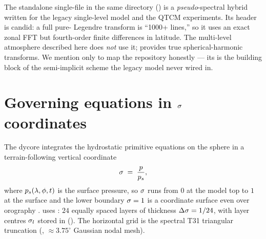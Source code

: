 \begin{remark}
The standalone single-file  in the same directory
() is a \emph{pseudo}-spectral hybrid written
for the legacy single-level model and the QTCM experiments. Its header is candid:
a full pure-\jax{} Legendre transform is ``1000+ lines,'' so it uses an exact
zonal FFT but fourth-order finite differences in latitude. The multi-level
atmosphere described here does \emph{not} use it; \dino{} provides true
spherical-harmonic transforms. We mention  only to map the
repository honestly --- its  is the building block of the
semi-implicit scheme the legacy model never wired in.
\end{remark}

\section{Governing equations in $\sigma$ coordinates}

The dycore integrates the hydrostatic primitive equations on the sphere in a
terrain-following vertical coordinate
\begin{equation}
  \sigma \;=\; \frac{p}{p_s},
\end{equation}
where $p_s(\lambda,\phi,t)$ is the surface pressure, so $\sigma$ runs from $0$ at
the model top to $1$ at the surface and the lower boundary $\sigma=1$ is a
coordinate surface even over orography \citep[Ch.~12]{vallis2017}. \model{} uses
: $24$ equally spaced layers of thickness
$\Delta\sigma = 1/24$, with layer centres $\sigma_l$ stored in 
(). The horizontal grid is the spectral T31 triangular truncation
(, $\approx 3.75^\circ$ Gaussian nodal mesh).


